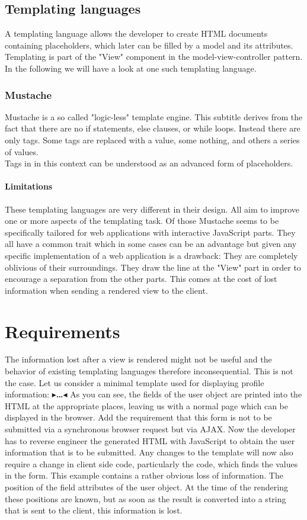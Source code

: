 \documentclass[twoside,11pt,openright]{report}
\newcommand{\todo}[1]{{\color[rgb]{.5,0,0}\textbf{$\blacktriangleright$#1$\blacktriangleleft$}}}
\begin{document}
\section{Templating languages}
A templating language allows the developer to create HTML documents containing
placeholders, which later can be filled by a model and its attributes.
Templating is part of the "View" component in the model-view-controller
pattern. In the following we will have a look at one such templating language.
\subsection{Mustache}
Mustache is a so called "logic-less" template engine.
This subtitle derives from the fact that there are no if statements,
else clauses, or while loops. Instead there are only tags. Some tags are
replaced with a value, some nothing, and others a series of values.\\
Tags in in this context can be understood as an advanced form of placeholders.
\subsubsection{Limitations}
These templating languages are very different in their design.
All aim to improve one or more aspects of the templating task.
Of those Mustache seems to be specifically tailored for web applications
with interactive JavaScript parts.
They all have a common trait which in some cases can be an advantage
but given any specific implementation of a web application is a drawback:
They are completely oblivious of their surroundings. They draw the line
at the "View" part in order to encourage a separation from the other
parts. This comes at the cost of lost information when sending a
rendered view to the client.


\chapter{Requirements}
The information lost after a view is rendered might not be useful and
the behavior of existing templating languages therefore inconsequential.
This is not the case. Let us consider a minimal template used for
displaying profile information:
\todo{\dots}
As you can see, the fields of the user object are printed into the HTML
at the appropriate places, leaving us with a normal page which can be
displayed in the browser.
Add the requirement that this form is not to be submitted via a
synchronous browser request but via AJAX. Now the developer has to
reverse engineer the generated HTML with JavaScript to obtain the
user information that is to be submitted. Any changes to the template
will now also require a change in client side code, particularly the
code, which finds the values in the form.
This example contains a rather obvious loss of information.
The position of the field attributes of the user object.
At the time of the rendering these positions are known, but as soon as the
result is converted into a string that is sent to the client, this
information is lost.
\end{document}
